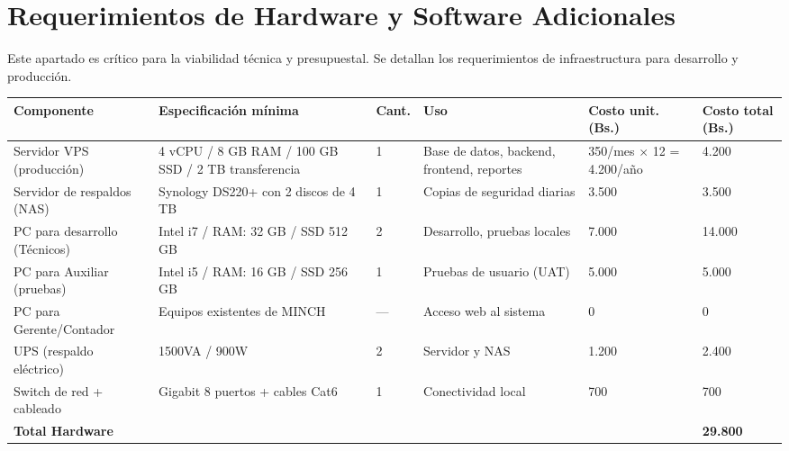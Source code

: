 \documentclass[stu]{apa7}
\begin{document}
\section{Requerimientos de Hardware y Software Adicionales}

Este apartado es crítico para la viabilidad técnica y presupuestal. Se detallan los requerimientos de infraestructura para desarrollo y producción.

\begin{longtable}{|L{4cm}|L{5cm}|C{1.5cm}|L{2.5cm}|C{1.5cm}|C{1.5cm}|}
\hline
{}
\textbf{Componente} & \textbf{Especificación mínima} & \textbf{Cant.} & \textbf{Uso} & \textbf{Costo unit. (Bs.)} & \textbf{Costo total (Bs.)} \\
\hline
Servidor VPS (producción) & 4 vCPU / 8 GB RAM / 100 GB SSD / 2 TB transferencia & 1 & Base de datos, backend, frontend, reportes & 350/mes $\times$ 12 = 4.200/año & 4.200 \\
\hline
Servidor de respaldos (NAS) & Synology DS220+ con 2 discos de 4 TB & 1 & Copias de seguridad diarias & 3.500 & 3.500 \\
\hline
PC para desarrollo (Técnicos) & Intel i7 / RAM: 32 GB / SSD 512 GB & 2 & Desarrollo, pruebas locales & 7.000 & 14.000 \\
\hline
PC para Auxiliar (pruebas) & Intel i5 / RAM: 16 GB / SSD 256 GB & 1 & Pruebas de usuario (UAT) & 5.000 & 5.000 \\
\hline
PC para Gerente/Contador & Equipos existentes de MINCH & --- & Acceso web al sistema & 0 & 0 \\
\hline
UPS (respaldo eléctrico) & 1500VA / 900W & 2 & Servidor y NAS & 1.200 & 2.400 \\
\hline
Switch de red + cableado & Gigabit 8 puertos + cables Cat6 & 1 & Conectividad local & 700 & 700 \\
\hline
{}
\textbf{Total Hardware} & & & & & \textbf{29.800} \\
\hline
\end{longtable}
\end{document}
